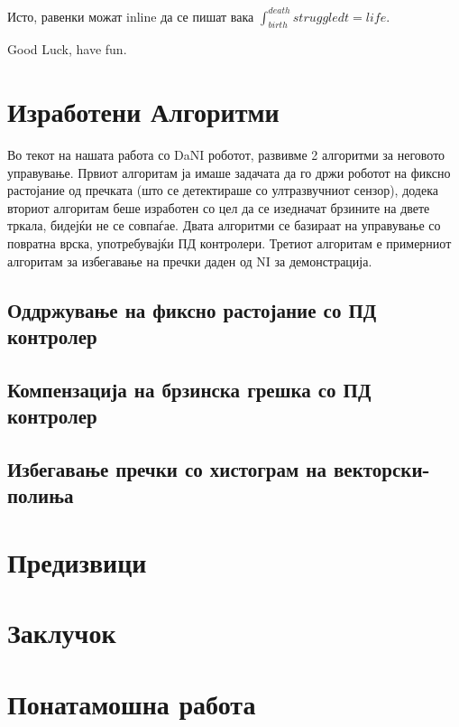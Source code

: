 \documentclass{article}
\begin{document}
Исто, равенки можат inline да се пишат вака $\int_{birth}^{death}{struggle dt} = life $.

Good Luck, have fun.

\section{Изработени Алгоритми}
Во текот на нашата работа со DaNI роботот, развивме 2 алгоритми за неговото управување. Првиот алгоритам ја имаше задачата да го држи роботот на фиксно растојание од пречката (што се детектираше со ултразвучниот сензор), додека вториот алгоритам беше изработен со цел да се изедначат брзините на двете тркала, бидејќи не се совпаѓае. Двата алгоритми се базираат на управување со повратна врска, употребувајќи ПД контролери. Третиот алгоритам е примерниот алгоритам за избегавање на пречки даден од NI за демонстрација. 
\subsection{Оддржување на фиксно растојание со ПД контролер}
\subsection{Компензација на брзинска грешка со ПД контролер}
\subsection{Избегавање пречки со хистограм на векторски-полиња}

\section{Предизвици}
\section{Заклучок}
\section{Понатамошна работа}
\end{document}
